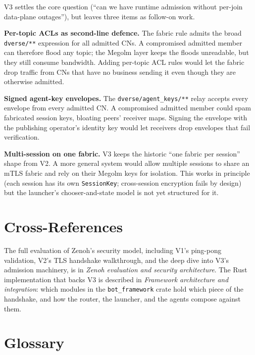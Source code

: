 \documentclass[11pt,a4paper]{article}
\begin{document}
V3 settles the core question (``can we have runtime admission
without per-join data-plane outages''), but leaves three items as
follow-on work.

\textbf{Per-topic ACLs as second-line defence.} The fabric rule
admits the broad \texttt{dverse/**} expression for all admitted
CNs. A compromised admitted member can therefore flood any topic;
the Megolm layer keeps the floods unreadable, but they still
consume bandwidth. Adding per-topic ACL rules would let the
fabric drop traffic from CNs that have no business sending it
even though they are otherwise admitted.

\textbf{Signed agent-key envelopes.} The
\texttt{dverse/agent\_keys/**} relay accepts every envelope from
every admitted CN. A compromised admitted member could spam
fabricated session keys, bloating peers' receiver maps. Signing
the envelope with the publishing operator's identity key would
let receivers drop envelopes that fail verification.

\textbf{Multi-session on one fabric.} V3 keeps the historic
``one fabric per session'' shape from V2. A more general system
would allow multiple sessions to share an mTLS fabric and rely on
their Megolm keys for isolation. This works in principle (each
session has its own \texttt{SessionKey}; cross-session encryption
fails by design) but the launcher's chooser-and-state model is
not yet structured for it.

\section{Cross-References}

The full evaluation of Zenoh's security model, including V1's
ping-pong validation, V2's TLS handshake walkthrough, and the
deep dive into V3's admission machinery, is in
\emph{Zenoh evaluation and security architecture}. The Rust
implementation that backs V3 is described in
\emph{Framework architecture and integration}: which modules in
the \texttt{bot\_framework} crate hold which piece of the
handshake, and how the router, the launcher, and the agents
compose against them.

\section*{Glossary}
\end{document}
